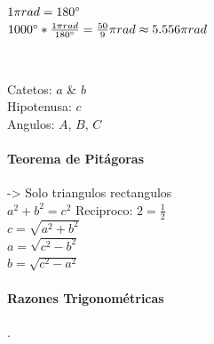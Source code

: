 \documentclass[stu, 12pt, a4paper, donotrepeattitle, floatsintext, natbib]{apa7}
\begin{document}
    $1\pi{rad} = 180\degree$\\
    $1000\degree * \frac{1\pi{rad}}{180\degree} = \frac{50}{9}\pi{rad} \approx 5.556\pi{rad}$

    \newpage

    \begin{paracol}{2}
         \\

        \switchcolumn

        Catetos: $a$ \& $b$ \\
        Hipotenusa: $c$ \\
        Angulos: $A$, $B$, $C$
    \end{paracol}

    \paragraph{Teorema de Pitágoras} -> Solo triangulos rectangulos\\
    $a^2+b^2=c^2$ \hspace{8cm} Reciproco: $2=\frac{1}{2}$\\
    $c=\sqrt{a^2+b^2}$\\
    $a=\sqrt{c^2-b^2}$\\
    $b=\sqrt{c^2-a^2}$

    \paragraph{Razones Trigonométricas}.\\[0.5cm]

    \newcommand{\sinA}{$\displaystyle \sin(A) = \frac{C.O}{HIP} \textcolor{blue}{= \frac{a}{c}}$}
    \newcommand{\cosA}{$\displaystyle \cos(A) = \frac{C.A}{HIP} \textcolor{blue}{=\frac{b}{c}}$}
    \newcommand{\tanA}{$\displaystyle \tan(A) = \frac{C.O}{C.A} \textcolor{blue}{=\frac{a}{b}}$}
    \newcommand{\cotA}{$\displaystyle \cot(A) \textcolor{red}{=\frac{b}{a}}$}
    \newcommand{\secA}{$\displaystyle \sec(A) \textcolor{red}{=\frac{c}{b}}$}
    \newcommand{\cscA}{$\displaystyle \csc(A) \textcolor{red}{=\frac{c}{a}}$}
\end{document}
